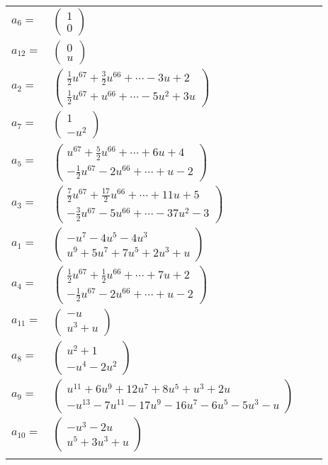\documentclass[1p]{elsarticle_modified}
\theoremstyle{definition}
\begin{document}
\begin{tabular}{m{7pt} m{180pt} m{7pt} m{180pt} }
\flushright $a_{6}=$&$\begin{pmatrix}1\\0\end{pmatrix}$ \\
\flushright $a_{12}=$&$\begin{pmatrix}0\\u\end{pmatrix}$ \\
\flushright $a_{2}=$&$\begin{pmatrix}\frac{1}{2} u^{67}+\frac{3}{2} u^{66}+\cdots-3 u+2\\\frac{1}{2} u^{67}+u^{66}+\cdots-5 u^2+3 u\end{pmatrix}$ \\
\flushright $a_{7}=$&$\begin{pmatrix}1\\- u^2\end{pmatrix}$ \\
\flushright $a_{5}=$&$\begin{pmatrix}u^{67}+\frac{5}{2} u^{66}+\cdots+6 u+4\\-\frac{1}{2} u^{67}-2 u^{66}+\cdots+u-2\end{pmatrix}$ \\
\flushright $a_{3}=$&$\begin{pmatrix}\frac{7}{2} u^{67}+\frac{17}{2} u^{66}+\cdots+11 u+5\\-\frac{3}{2} u^{67}-5 u^{66}+\cdots-37 u^2-3\end{pmatrix}$ \\
\flushright $a_{1}=$&$\begin{pmatrix}- u^7-4 u^5-4 u^3\\u^9+5 u^7+7 u^5+2 u^3+u\end{pmatrix}$ \\
\flushright $a_{4}=$&$\begin{pmatrix}\frac{1}{2} u^{67}+\frac{1}{2} u^{66}+\cdots+7 u+2\\-\frac{1}{2} u^{67}-2 u^{66}+\cdots+u-2\end{pmatrix}$ \\
\flushright $a_{11}=$&$\begin{pmatrix}- u\\u^3+u\end{pmatrix}$ \\
\flushright $a_{8}=$&$\begin{pmatrix}u^2+1\\- u^4-2 u^2\end{pmatrix}$ \\
\flushright $a_{9}=$&$\begin{pmatrix}u^{11}+6 u^9+12 u^7+8 u^5+u^3+2 u\\- u^{13}-7 u^{11}-17 u^9-16 u^7-6 u^5-5 u^3- u\end{pmatrix}$ \\
\flushright $a_{10}=$&$\begin{pmatrix}- u^3-2 u\\u^5+3 u^3+u\end{pmatrix}$\\&\end{tabular}
\end{document}
